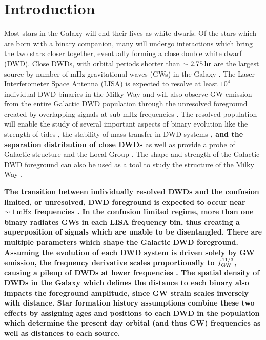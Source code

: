 \documentclass[twocolumn, linenumbers]{aastex631}
\begin{document}
\section{Introduction} \label{sec:intro}
Most stars in the Galaxy will end their lives as white dwarfs. Of the stars which are born with a binary companion, many will undergo interactions which bring the two stars closer together, eventually forming a close double white dwarf (DWD). Close DWDs, with orbital periods shorter than $\sim2.75\,\rm{hr}$ are the largest source by number of mHz gravitational waves (GWs) in the Galaxy \citep[e.g.,][]{LISAMissionProposal}. The Laser Interferometer Space Antenna (LISA) is expected to resolve at least $10^4$ individual DWD binaries in the Milky Way and will also observe GW emission from the entire Galactic DWD population through the unresolved foreground created by overlapping signals at sub-mHz frequencies \citep[e.g.,][]{Nelemans2001a, Ruiter2010, Nissanke2012, Yu2013, Korol2017, Lamberts2019, Breivik2020a}. The resolved population will enable the study of several important aspects of binary evolution like the strength of tides \citep{Valsecchi2012}, the stability of mass transfer in DWD systems \citep[e.g.,][]{Marsh2004, Shen2015, Gokhale2007, Sepinsky2014, Kremer2015}\textbf{, and the separation distribution of close DWDs \citep{Korol2021}} as well as provide a probe of Galactic structure \citep{Korol2019} and the Local Group \citep{Korol2018}. The shape and strength of the Galactic DWD foreground can also be used as a tool to study the structure of the Milky Way \citep{Benacquista2006, Breivik2020b}.

\textbf{The transition between individually resolved DWDs and the confusion limited, or unresolved, DWD foreground is expected to occur near $\sim1\,\rm{mHz}$ frequencies \citep[e.g. ][]{Ruiter2010}. In the confusion limited regime, more than one binary radiates GWs in each LISA frequency bin, thus creating a superposition of signals which are unable to be disentangled. There are multiple parameters which shape the Galactic DWD foreground. Assuming the evolution of each DWD system is driven solely by GW emission, the frequency derivative scales proportionally to $f_{\rm{GW}}^{11/3}$, causing a pileup of DWDs at lower frequencies \citep[e.g.][]{Breivik2020b}. The spatial density of DWDs in the Galaxy which defines the distance to each binary also impacts the foreground amplitude, since GW strain scales inversely with distance. Star formation history assumptions combine these two effects by assigning ages and positions to each DWD in the population which determine the present day orbital (and thus GW) frequencies as well as distances to each source.}
\end{document}
